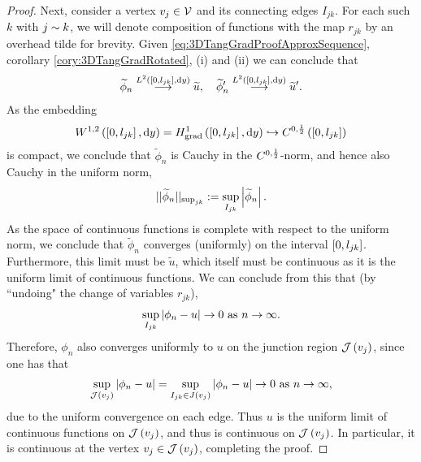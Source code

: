 \begin{proof}
	Next, consider a vertex $v_j\in\mathcal{V}$ and its connecting edges $I_{jk}$.
	For each such $k$ with $j\sim k$, we will denote composition of functions with the map $r_{jk}$ by an overhead tilde for brevity.
	Given \eqref{eq:3DTangGradProofApproxSequence}, corollary \ref{cory:3DTangGradRotated}, (i) and (ii) we can conclude that
	\begin{align*}
		\widetilde{\phi}_n \overset{L^{2}\left( \left[ 0,l_{jk} \right],\mathrm{d} y \right)}{\longrightarrow} \widetilde{u},
		\quad
		\widetilde{\phi}_n' \overset{L^{2}\left( \left[ 0,l_{jk} \right],\mathrm{d} y \right)}{\longrightarrow} \widetilde{u}'.
	\end{align*}
	As the embedding
	\begin{align*}
		W^{1,2}\left( \left[ 0,l_{jk} \right],\mathrm{d} y \right) = H^1_\mathrm{grad}\left( \left[ 0,l_{jk} \right], \mathrm{d}y \right) \hookrightarrow C^{0,\frac{1}{2}}\left( \left[ 0,l_{jk} \right] \right)
	\end{align*}
	is compact, we conclude that $\widetilde{\phi}_n$ is Cauchy in the $C^{0,\frac{1}{2}}$-norm, and hence also Cauchy in the uniform norm,
	\begin{align*}
		\lvert\lvert \widetilde{\phi}_n \rvert\rvert_{\sup_{jk}} := \sup_{I_{jk}}\left\lvert \widetilde{\phi}_n \right\rvert.
	\end{align*}
	As the space of continuous functions is complete with respect to the uniform norm, we conclude that $\widetilde{\phi}_n$ converges (uniformly) on the interval $\left[ 0,l_{jk} \right]$.
	Furthermore, this limit must be $\widetilde{u}$, which itself must be continuous as it is the uniform limit of continuous functions.
	We can conclude from this that (by ``undoing" the change of variables $r_{jk}$),
	\begin{align*}
		\sup_{I_{jk}}\left\lvert \phi_n - u \right\rvert \rightarrow 0 \ \text{as} \ n \rightarrow\infty.
	\end{align*}
	Therefore, $\phi_n$ also converges uniformly to $u$ on the junction region $\mathcal{J}\left( v_j \right)$, since one has that
	\begin{align*}
		\sup_{\mathcal{J}\left( v_j \right)}\left\lvert \phi_n - u \right\rvert = \sup_{I_{jk}\in J(v_j)}\left\lvert \phi_n - u \right\rvert \rightarrow 0 \ \text{as} \ n \rightarrow\infty,
	\end{align*}
	due to the uniform convergence on each edge.
	Thus $u$ is the uniform limit of continuous functions on $\mathcal{J}\left( v_j \right)$, and thus is continuous on $\mathcal{J}\left( v_j \right)$.
	In particular, it is continuous at the vertex $v_j\in \mathcal{J}\left( v_j \right)$, completing the proof.
\end{proof}

